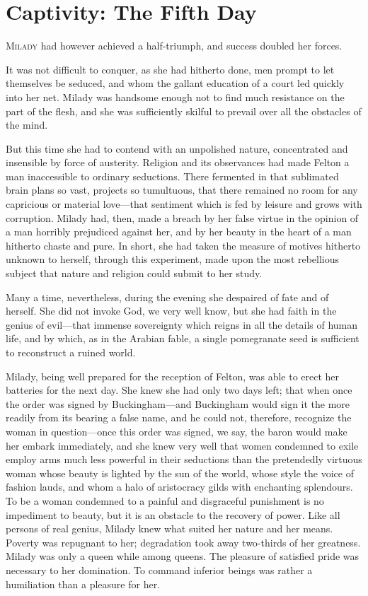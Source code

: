 
\chapter{Captivity: The Fifth Day}

\lettrine[]{M}{ilady} had however achieved a half-triumph, and success doubled her forces. 

\zz
It was not difficult to conquer, as she had hitherto done, men prompt to let themselves be seduced, and whom the gallant education of a court led quickly into her net. Milady was handsome enough not to find much resistance on the part of the flesh, and she was sufficiently skilful to prevail over all the obstacles of the mind. 

But this time she had to contend with an unpolished nature, concentrated and insensible by force of austerity. Religion and its observances had made Felton a man inaccessible to ordinary seductions. There fermented in that sublimated brain plans so vast, projects so tumultuous, that there remained no room for any capricious or material love---that sentiment which is fed by leisure and grows with corruption. Milady had, then, made a breach by her false virtue in the opinion of a man horribly prejudiced against her, and by her beauty in the heart of a man hitherto chaste and pure. In short, she had taken the measure of motives hitherto unknown to herself, through this experiment, made upon the most rebellious subject that nature and religion could submit to her study. 

Many a time, nevertheless, during the evening she despaired of fate and of herself. She did not invoke God, we very well know, but she had faith in the genius of evil---that immense sovereignty which reigns in all the details of human life, and by which, as in the Arabian fable, a single pomegranate seed is sufficient to reconstruct a ruined world. 

Milady, being well prepared for the reception of Felton, was able to erect her batteries for the next day. She knew she had only two days left; that when once the order was signed by Buckingham---and Buckingham would sign it the more readily from its bearing a false name, and he could not, therefore, recognize the woman in question---once this order was signed, we say, the baron would make her embark immediately, and she knew very well that women condemned to exile employ arms much less powerful in their seductions than the pretendedly virtuous woman whose beauty is lighted by the sun of the world, whose style the voice of fashion lauds, and whom a halo of aristocracy gilds with enchanting splendours. To be a woman condemned to a painful and disgraceful punishment is no impediment to beauty, but it is an obstacle to the recovery of power. Like all persons of real genius, Milady knew what suited her nature and her means. Poverty was repugnant to her; degradation took away two-thirds of her greatness. Milady was only a queen while among queens. The pleasure of satisfied pride was necessary to her domination. To command inferior beings was rather a humiliation than a pleasure for her. 

